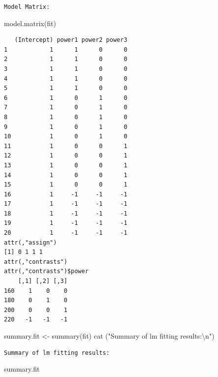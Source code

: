 \documentclass[
  letterpaper,
]{scrbook}
\newenvironment{Shaded}{\begin{snugshade}}{\end{snugshade}}
\newcommand{\FunctionTok}[1]{\textcolor[rgb]{0.28,0.35,0.67}{#1}}
\newcommand{\NormalTok}[1]{\textcolor[rgb]{0.00,0.23,0.31}{#1}}
\newcommand{\OtherTok}[1]{\textcolor[rgb]{0.00,0.23,0.31}{#1}}
\newcommand{\SpecialCharTok}[1]{\textcolor[rgb]{0.37,0.37,0.37}{#1}}
\newcommand{\StringTok}[1]{\textcolor[rgb]{0.13,0.47,0.30}{#1}}
\begin{document}
\begin{verbatim}
Model Matrix:
\end{verbatim}

\begin{Shaded}
\begin{Highlighting}[]
\FunctionTok{model.matrix}\NormalTok{(fit)}
\end{Highlighting}
\end{Shaded}

\begin{verbatim}
   (Intercept) power1 power2 power3
1            1      1      0      0
2            1      1      0      0
3            1      1      0      0
4            1      1      0      0
5            1      1      0      0
6            1      0      1      0
7            1      0      1      0
8            1      0      1      0
9            1      0      1      0
10           1      0      1      0
11           1      0      0      1
12           1      0      0      1
13           1      0      0      1
14           1      0      0      1
15           1      0      0      1
16           1     -1     -1     -1
17           1     -1     -1     -1
18           1     -1     -1     -1
19           1     -1     -1     -1
20           1     -1     -1     -1
attr(,"assign")
[1] 0 1 1 1
attr(,"contrasts")
attr(,"contrasts")$power
    [,1] [,2] [,3]
160    1    0    0
180    0    1    0
200    0    0    1
220   -1   -1   -1
\end{verbatim}

\begin{Shaded}
\begin{Highlighting}[]
\NormalTok{summary.fit }\OtherTok{\textless{}{-}} \FunctionTok{summary}\NormalTok{(fit)}
\FunctionTok{cat}\NormalTok{ (}\StringTok{"Summary of lm fitting results:}\SpecialCharTok{\textbackslash{}n}\StringTok{"}\NormalTok{)}
\end{Highlighting}
\end{Shaded}

\begin{verbatim}
Summary of lm fitting results:
\end{verbatim}

\begin{Shaded}
\begin{Highlighting}[]
\NormalTok{summary.fit}
\end{Highlighting}
\end{Shaded}
\end{document}
